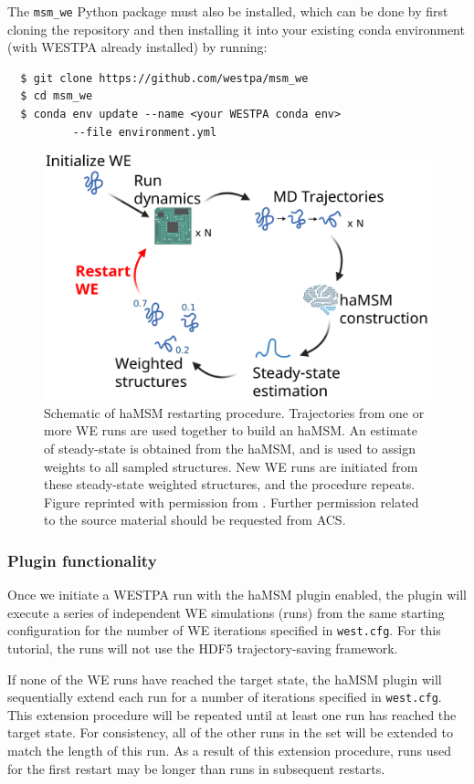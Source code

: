 The \verb|msm_we| Python package must also be installed, which can be done by first cloning the repository and then installing it into your existing conda environment (with WESTPA already installed) by running:
\begin{verbatim}
  $ git clone https://github.com/westpa/msm_we
  $ cd msm_we 
  $ conda env update --name <your WESTPA conda env> 
          --file environment.yml
\end{verbatim}

\begin{figure}[t]
\centering
\includegraphics[width=\columnwidth]{figures/Figure6_haMSM.pdf}
\caption{Schematic of haMSM restarting procedure. 
Trajectories from one or more WE runs are used together to build an haMSM. 
An estimate of steady-state is obtained from the haMSM, and is used to assign weights to all sampled structures. 
New WE runs are initiated from these steady-state weighted structures, and the procedure repeats. 
Figure reprinted with permission from \citep{russo_westpa_2022}. 
Further permission related to the source material should be requested from ACS.}
\end{figure}

\subsubsection{Plugin functionality}
Once we initiate a WESTPA run with the haMSM plugin enabled, the plugin will execute a series of independent WE simulations (runs) from the same starting configuration for the number of WE iterations specified in \verb|west.cfg|. 
For this tutorial, the runs will not use the HDF5 trajectory-saving framework.

If none of the WE runs have reached the target state, the haMSM plugin will sequentially extend each run for a number of iterations specified in \verb|west.cfg|. 
This extension procedure will be repeated until at least one run has reached the target state. 
For consistency, all of the other runs in the set will be extended to match the length of this run. 
As a result of this extension procedure, runs used for the first restart may be longer than runs in subsequent restarts.


